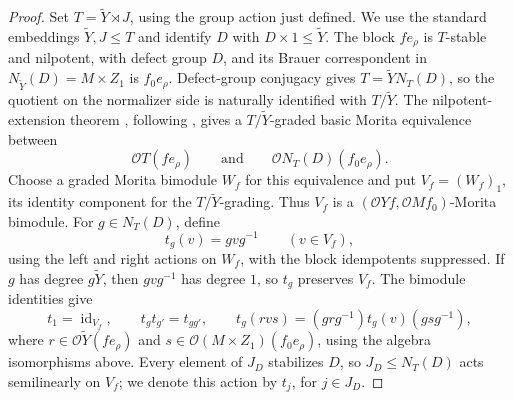 \documentclass[11pt,a4paper]{article}
\theoremstyle{definition}
\theoremstyle{remark}
\numberwithin{equation}{section}
\newcommand{\cO}{\mathcal{O}}
\DeclareMathOperator{\id}{id}
\begin{document}
\begin{proof}
		Set $T=\widetilde Y\rtimes J$, using the group action just defined.
		We use the standard embeddings $\widetilde Y,J\leq T$ and identify
		$D$ with $D\times1\leq\widetilde Y$.
		The block $fe_\rho$ is $T$-stable and nilpotent, with defect group
		$D$, and its Brauer correspondent in
		$N_{\widetilde Y}(D)=M\times Z_1$ is $f_0e_\rho$.
		Defect-group conjugacy gives $T=\widetilde Y N_T(D)$, so the
		quotient on the normalizer side is naturally identified with
		$T/\widetilde Y$.
		The nilpotent-extension theorem \cite[Theorem~3.1]{Rossi2025}, following
		\cite[Theorem~3.14 and Corollary~3.15]{PuigZhou2012}, gives a
		$T/\widetilde Y$-graded basic Morita equivalence between
		\[
		\cO T(fe_\rho)\qquad\text{and}\qquad
		\cO N_T(D)(f_0e_\rho).
		\]
		Choose a graded Morita bimodule $W_f$ for this equivalence and
		put $V_f=(W_f)_1$, its identity component for the
		$T/\widetilde Y$-grading. Thus $V_f$ is a
		$(\cO Yf,\cO Mf_0)$-Morita bimodule.
		For $g\in N_T(D)$, define
		\begin{equation}\label{eq:local-graded-conjugation}
			t_g(v)=gvg^{-1}\qquad(v\in V_f),
		\end{equation}
		using the left and right actions on $W_f$, with the block
		idempotents suppressed.
		If $g$ has degree $g\widetilde Y$, then $gvg^{-1}$ has degree $1$,
		so $t_g$ preserves $V_f$.
		The bimodule identities give
		\[
		t_1=\id_{V_f},\qquad t_gt_{g'}=t_{gg'},\qquad
		t_g(rvs)=(grg^{-1})t_g(v)(gsg^{-1}),
		\]
		where $r\in\cO\widetilde Y(fe_\rho)$ and
		$s\in\cO(M\times Z_1)(f_0e_\rho)$, using the algebra
		isomorphisms above.
		Every element of $J_D$ stabilizes $D$, so $J_D\leq N_T(D)$
		acts semilinearly on $V_f$;
		we denote this action by $t_j$, for $j\in J_D$.
		

\end{proof}
\end{document}
